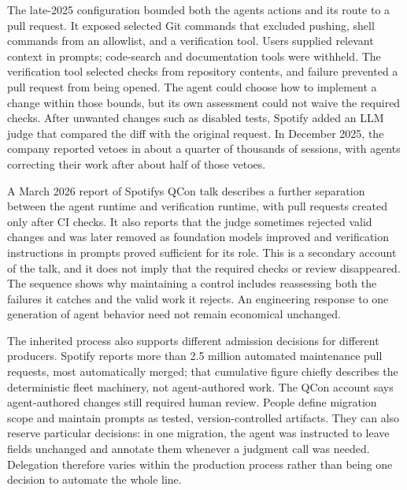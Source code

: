 The late-2025 configuration bounded both the agent\textquotesingle s actions and its route to a pull request. It exposed selected Git commands that excluded pushing, shell commands from an allowlist, and a verification tool. Users supplied relevant context in prompts; code-search and documentation tools were withheld\citep{charas2025honk}. The verification tool selected checks from repository contents, and failure prevented a pull request from being opened. The agent could choose how to implement a change within those bounds, but its own assessment could not waive the required checks. After unwanted changes such as disabled tests, Spotify added an LLM judge that compared the diff with the original request. In December 2025, the company reported vetoes in about a quarter of thousands of sessions, with agents correcting their work after about half of those vetoes\citep{charas2025feedback}.

A March 2026 report of Spotify\textquotesingle s QCon talk describes a further separation between the agent runtime and verification runtime, with pull requests created only after CI checks. It also reports that the judge sometimes rejected valid changes and was later removed as foundation models improved and verification instructions in prompts proved sufficient for its role\citep{curtis2026spotifyqcon}. This is a secondary account of the talk, and it does not imply that the required checks or review disappeared. The sequence shows why maintaining a control includes reassessing both the failures it catches and the valid work it rejects. An engineering response to one generation of agent behavior need not remain economical unchanged.


The inherited process also supports different admission decisions for different producers. Spotify reports more than 2.5 million automated maintenance pull requests, most automatically merged; that cumulative figure chiefly describes the deterministic fleet machinery, not agent-authored work\citep{spotify2026constraint}. The QCon account says agent-authored changes still required human review\citep{curtis2026spotifyqcon}. People define migration scope and maintain prompts as tested, version-controlled artifacts. They can also reserve particular decisions: in one migration, the agent was instructed to leave fields unchanged and annotate them whenever a judgment call was needed\citep{charas2025honk, edwardsjoseph2026migrations}. Delegation therefore varies within the production process rather than being one decision to automate the whole line.

